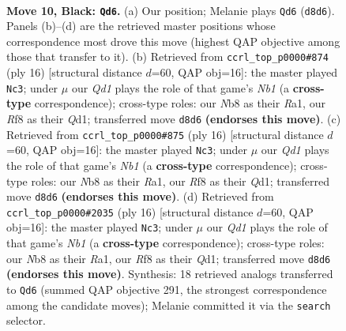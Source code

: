 \documentclass[11pt]{article}
\begin{document}
\clearpage

\begin{figure}[p]\centering
\begin{subfigure}{0.46\textwidth}\centering
\resizebox{\linewidth}{!}{%
\newchessgame
\chessboard[
  setfen={rnbq1rk1/ppp1bp1p/6p1/3pN3/3P4/6P1/PP2PP1P/RNBQ1RK1 b - - 1 10},
  showmover=false,
  pgfstyle=straightmove, color=movearrow, markmove={d8-d6}
]}
\caption{}
\end{subfigure}\hfill
\begin{subfigure}{0.46\textwidth}\centering
\resizebox{\linewidth}{!}{%
\newchessgame
\chessboard[
  setfen={rnbq1rk1/pp2ppbp/6p1/3n4/3N4/6P1/PP2PPBP/RNBQ1RK1 w - - 0 9},
  showmover=false,
  pgfstyle=straightmove, color=movearrow, markmove={b1-c3}
]}
\caption{}
\end{subfigure}
\\[4pt]
\begin{subfigure}{0.46\textwidth}\centering
\resizebox{\linewidth}{!}{%
\newchessgame
\chessboard[
  setfen={rnbq1rk1/pp2ppbp/6p1/3n4/3N4/6P1/PP2PPBP/RNBQ1RK1 w - - 0 9},
  showmover=false,
  pgfstyle=straightmove, color=movearrow, markmove={b1-c3}
]}
\caption{}
\end{subfigure}\hfill
\begin{subfigure}{0.46\textwidth}\centering
\resizebox{\linewidth}{!}{%
\newchessgame
\chessboard[
  setfen={rnbq1rk1/pp2ppbp/6p1/3n4/3N4/6P1/PP2PPBP/RNBQ1RK1 w - - 0 9},
  showmover=false,
  pgfstyle=straightmove, color=movearrow, markmove={b1-c3}
]}
\caption{}
\end{subfigure}
\caption{\textbf{Move 10, Black: \texttt{Qd6}.} (a) Our position; Melanie plays \texttt{Qd6} (\texttt{d8d6}). Panels (b)--(d) are the retrieved master positions whose correspondence most drove this move (highest QAP objective among those that transfer to it). (b) Retrieved from \texttt{ccrl\_top\_p0000\#874} (ply 16) [structural distance $d$=60, QAP obj=16]: the master played \texttt{Nc3}; under $\mu$ our \emph{Qd1} plays the role of that game's \emph{Nb1} (a \textbf{cross-type} correspondence); cross-type roles: our \emph{N}b8 as their \emph{R}a1, our \emph{R}f8 as their \emph{Q}d1; transferred move \texttt{d8d6} \textbf{(endorses this move)}. (c) Retrieved from \texttt{ccrl\_top\_p0000\#875} (ply 16) [structural distance $d$=60, QAP obj=16]: the master played \texttt{Nc3}; under $\mu$ our \emph{Qd1} plays the role of that game's \emph{Nb1} (a \textbf{cross-type} correspondence); cross-type roles: our \emph{N}b8 as their \emph{R}a1, our \emph{R}f8 as their \emph{Q}d1; transferred move \texttt{d8d6} \textbf{(endorses this move)}. (d) Retrieved from \texttt{ccrl\_top\_p0000\#2035} (ply 16) [structural distance $d$=60, QAP obj=16]: the master played \texttt{Nc3}; under $\mu$ our \emph{Qd1} plays the role of that game's \emph{Nb1} (a \textbf{cross-type} correspondence); cross-type roles: our \emph{N}b8 as their \emph{R}a1, our \emph{R}f8 as their \emph{Q}d1; transferred move \texttt{d8d6} \textbf{(endorses this move)}. Synthesis: 18 retrieved analogs transferred to \texttt{Qd6} (summed QAP objective 291, the strongest correspondence among the candidate moves); Melanie committed it via the \texttt{search} selector.}
\label{fig:thought-m19}
\end{figure}
\end{document}
